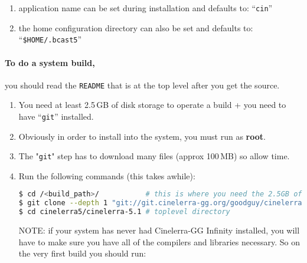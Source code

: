 \begin{enumerate}
    \item 
        application name can be set during installation and defaults to: “\texttt{cin}”
    \item 
        the home configuration directory can also be set and defaults to:\\ “\texttt{\$HOME/.bcast5}”
\end{enumerate}

\paragraph{To do a system build,} you should read the \texttt{README} that is at the top level after you get the source.

\begin{enumerate}
    \item 
        You need at least 2.5\,GB of disk storage to operate a build + you need to have “\texttt{git}” installed.
    \item  Obviously in order to install into the system, you must run as \textbf{root}.
    \item  The "\texttt{git}" step has to download many files (approx 100\,MB) so allow time.
    \item  Run the following commands (this takes awhile):

        \begin{lstlisting}[language=bash]
$ cd /<build_path>/           # this is where you need the 2.5GB of disk space
$ git clone --depth 1 "git://git.cinelerra-gg.org/goodguy/cinelerra.git" cinelerra5 
$ cd cinelerra5/cinelerra-5.1 # toplevel directory
        \end{lstlisting}

        NOTE: if your system has never had Cinelerra-GG Infinity installed, you will have to make sure you have all of the compilers and libraries necessary.  
        So on the very first build you should run:


\end{enumerate}
